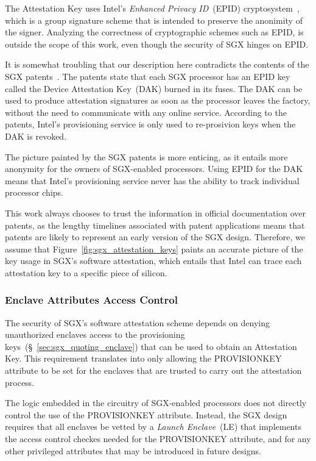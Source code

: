 The Attestation Key uses Intel's \textit{Enhanced Privacy ID}~(EPID)
cryptosystem~\cite{brickell2009epid}, which is a group signature scheme that is
intended to preserve the anonimity of the signer. Analyzing the correctness of
cryptographic schemes such as EPID, is outside the scope of this work, even
though the security of SGX hinges on EPID.

It is somewhat troubling that our description here contradicts the contents of
the SGX patents~\cite{intel2013patent1, intel2013patent2}. The patents state
that each SGX processor has an EPID key called the Device Attestation Key~(DAK)
burned in its fuses. The DAK can be used to produce attestation signatures as
soon as the processor leaves the factory, without the need to communicate with
any online service. According to the patents, Intel's provisioning service is
only used to re-prosivion keys when the DAK is revoked.

The picture painted by the SGX patents is more enticing, as it entails more
anonymity for the owners of SGX-enabled processors. Using EPID for the DAK
means that Intel's provisioning service never has the ability to track
individual processor chips.

This work always chooses to trust the information in official documentation
over patents, as the lengthy timelines associated with patent applications
means that patents are likely to represent an early version of the SGX design.
Therefore, we assume that Figure~\ref{fig:sgx_attestation_keys} paints an
accurate picture of the key usage in SGX's software attestation, which entails
that Intel can trace each attestation key to a specific piece of silicon.


\subsubsection{Enclave Attributes Access Control}
\label{sec:sgx_launch_enclave}


The security of SGX's software attestation scheme depends on denying
unauthorized enclaves access to the provisioning
keys~(\S~\ref{sec:sgx_quoting_enclave}) that can be used to obtain an
Attestation Key. This requirement translates into only allowing the
PROVISIONKEY attribute to be set for the enclaves that are trusted to carry out
the attestation process.

The logic embedded in the circuitry of SGX-enabled processors does not directly
control the use of the PROVISIONKEY attribute. Instead, the SGX design requires
that all enclaves be vetted by a \textit{Launch Enclave}~(LE) that implements
the access control checkes needed for the PROVISIONKEY attribute, and for any
other privileged attributes that may be introduced in future designs.

